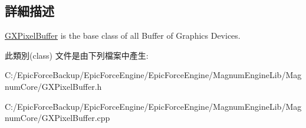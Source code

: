 \subsection{詳細描述}
\hyperlink{class_magnum_1_1_g_x_pixel_buffer}{G\+X\+Pixel\+Buffer} is the base class of all Buffer of Graphics Devices. 

此類別(class) 文件是由下列檔案中產生\+:\begin{DoxyCompactItemize}
\item 
C\+:/\+Epic\+Force\+Backup/\+Epic\+Force\+Engine/\+Epic\+Force\+Engine/\+Magnum\+Engine\+Lib/\+Magnum\+Core/G\+X\+Pixel\+Buffer.\+h\item 
C\+:/\+Epic\+Force\+Backup/\+Epic\+Force\+Engine/\+Epic\+Force\+Engine/\+Magnum\+Engine\+Lib/\+Magnum\+Core/G\+X\+Pixel\+Buffer.\+cpp\end{DoxyCompactItemize}
